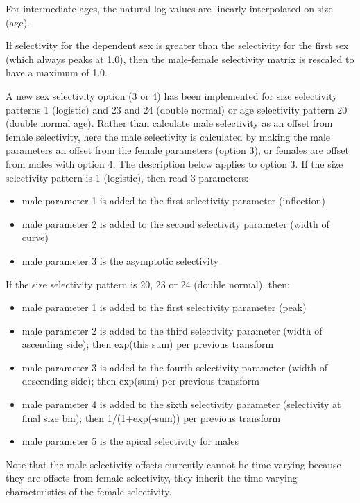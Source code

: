 For intermediate ages, the natural log values are linearly interpolated on size (age).

If selectivity for the dependent sex is greater than the selectivity for the first sex (which always peaks at 1.0), then the male-female selectivity matrix is rescaled to have a maximum of 1.0.

A new sex selectivity option (3 or 4) has been implemented for size selectivity patterns 1 (logistic) and 23 and 24 (double normal) or age selectivity pattern 20 (double normal age).  Rather than calculate male selectivity as an offset from female selectivity, here the male selectivity is calculated by making the male parameters an offset from the female parameters (option 3), or females are offset from males with option 4.  The description below applies to option 3. If the size selectivity pattern is 1 (logistic), then read 3 parameters:
\begin{itemize}
	\item male parameter 1 is added to the first selectivity parameter (inflection)
	\item male parameter 2 is added to the second selectivity parameter (width of curve)
	\item male parameter 3 is the asymptotic selectivity
\end{itemize}

If the size selectivity pattern is 20, 23 or 24 (double normal), then:
\begin{itemize}
	\item male parameter 1 is added to the first selectivity parameter (peak)
	\item male parameter 2 is added to the third selectivity parameter (width of ascending side); then exp(this sum) per previous transform
	\item male parameter 3 is added to the fourth selectivity parameter (width of descending side); then exp(sum) per previous transform
	\item male parameter 4 is added to the sixth selectivity parameter (selectivity at final size bin); then 1/(1+exp(-sum)) per previous transform
	\item male parameter 5 is the apical selectivity for males
\end{itemize}

Note that the male selectivity offsets currently cannot be time-varying because they are offsets from female selectivity, they inherit the time-varying characteristics of the female selectivity.

